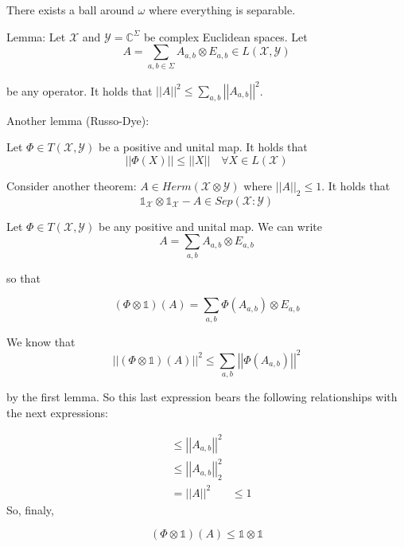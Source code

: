 \documentclass{article}
\begin{document}
        There exists a ball around $\omega$ where everything is separable.

        Lemma: Let $\mathcal{X}$ and $ \mathcal{Y} = \mathds{C}^\Sigma$ be
        complex Euclidean spaces. Let
        \[ 
                A = \sum_{a,b \in \Sigma} A_{a,b} \otimes E_{a,b} \in
                L(\mathcal{X},\mathcal{Y}) 
        \]
        
        be any operator. It holds that $\left| \left| A \right| \right|^2 \le
        \sum_{a,b} \left| \left| A_{a,b} \right| \right|^2$.

        Another lemma (Russo-Dye):

        Let $\Phi \in T(\mathcal{X},\mathcal{Y})$ be a positive and unital map.
        It holds that 
        \[\left| \left| \Phi(X) \right| \right| \le \left| \left| X
        \right| \right| \quad \forall X \in L(\mathcal{X})\] 

        Consider another theorem: $A \in Herm(\mathcal{X} \otimes \mathcal{Y})$
        where $\left| \left| A \right| \right|_2 \le 1$. It holds that 
        \[ 
                \mathds{1}_{\mathcal{X}} \otimes \mathds{1}_{\mathcal{X}} - A
                \in Sep(\mathcal{X}:\mathcal{Y}) 
        \]
        
        Let $\Phi \in T(\mathcal{X},\mathcal{Y})$ be any positive and unital
        map. We can write
        \[ 
                A = \sum_{a,b} A_{a,b} \otimes E_{a,b} 
        \]
        
        so that

        \[ 
                \left( \Phi \otimes \mathds{1} \right)(A) = \sum_{a,b}
                \Phi(A_{a,b}) \otimes E_{a,b}
        \]
        
        We know that 
        \[ 
                \left| \left| \left(\Phi \otimes \mathds{1}\right)(A) \right|
                \right| ^2 \le \sum_{a,b} \left| \left| \Phi(A_{a,b}) \right|
            \right|^2
        \]
        
        by the first lemma. So this last expression bears the following
        relationships with the next expressions:

        \begin{align*}
            & \le \left| \left| A_{a,b} \right| \right|^2 \\
            & \le \left| \left| A_{a,b} \right| \right|^2_2 \\
            & = \left| \left| A \right| \right|^2
            & \le 1
        \end{align*}
        So, finaly,

        \[ 
                \left( \Phi \otimes \mathds{1} \right) (A) \le \mathds{1}
                \otimes \mathds{1}
        \]
        
        
\end{document}
